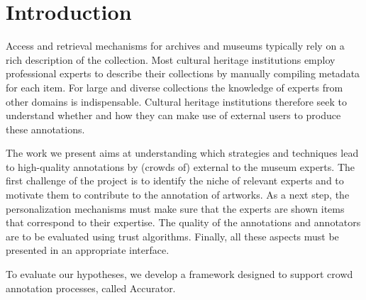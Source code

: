 \section{Introduction}\label{introduction}
Access and retrieval mechanisms for archives and museums typically rely on a rich description of the collection. 
Most cultural heritage institutions employ professional experts to describe their collections by manually compiling metadata for each item. 
For large and diverse collections the knowledge of experts from other domains is indispensable.
Cultural heritage institutions therefore seek to understand whether and how they can make use of external users to produce these annotations.

The work we present aims at understanding which strategies and techniques lead to high-quality annotations by (crowds of) external to the museum experts. 
The first challenge of the project is to identify the niche of relevant experts and to motivate them to contribute to the annotation of artworks. 
As a next step, the personalization mechanisms must make sure that the experts are shown items that correspond to their expertise. 
The quality of the annotations and annotators are to be evaluated using trust algorithms. Finally, all these aspects must be presented in an appropriate interface.

To evaluate our hypotheses, we develop a framework designed to support crowd annotation processes, called Accurator. 